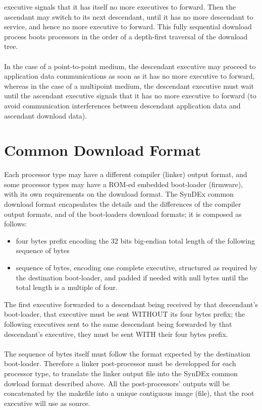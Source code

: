 \documentclass[11pt,twoside]{report}
\begin{document}
executive signals that it has itself no more executives to forward. Then
the ascendant may switch to its next descendant, until it has no more
descendant to service, and hence no more executive to forward. This
fully sequential download process boots processors in the order of a
depth-first traversal of the download tree.\\\\
In the case of a point-to-point medium, the descendant executive may
proceed to application data communications as soon as it has no more
executive to forward, whereas in the case of a multipoint medium, the
descendant executive must wait until the ascendant executive signals
that it has no more executive to forward (to avoid communication
interferences between descendant application data and ascendant download
data).

\section{Common Download Format}
Each processor type may have a different compiler (linker) output
format, and some processor types may have a ROM-ed embedded boot-loader
(firmware), with its own requirements on the download format. The SynDEx
common download format encapsulates the details and the differences of
the compiler output formats, and of the boot-loaders download formats;
it is composed as follows:
\begin{itemize}
\item four bytes prefix encoding the 32 bits big-endian total length of the following sequence of bytes
\item sequence of bytes, encoding one complete executive, structured as
  required by the destination boot-loader, and padded if needed with
  null bytes until the total length is a multiple of four.
\end{itemize}
The first executive forwarded to a descendant being received by that
descendant's boot-loader, that executive must be sent WITHOUT its four
bytes prefix; the following executives sent to the same descendant being
forwarded by that descendant's executive, they must be sent WITH their
four bytes prefix.\\\\
The sequence of bytes itself must follow the format
expected by the destination boot-loader. Therefore a linker
post-processor must be developped for each processor type, to translate
the linker output file into the SynDEx common dowload format described
above. All the post-processors' outputs will be concatenated by the
makefile into a unique contiguous image (file), that the root executive
will use as source.
\end{document}

